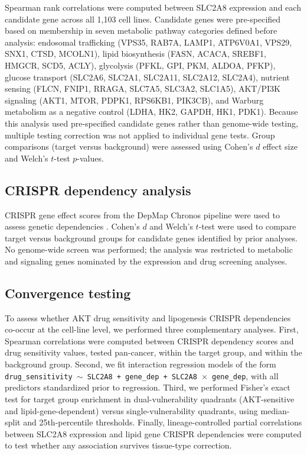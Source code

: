 \documentclass[12pt]{article}
\begin{document}
Spearman rank correlations were computed between SLC2A8 expression and
each candidate gene across all 1,103 cell lines. Candidate genes were
pre-specified based on membership in seven metabolic pathway categories
defined before analysis: endosomal trafficking (VPS35, RAB7A, LAMP1,
ATP6V0A1, VPS29, SNX1, CTSD, MCOLN1), lipid biosynthesis (FASN, ACACA,
SREBF1, HMGCR, SCD5, ACLY), glycolysis (PFKL, GPI, PKM, ALDOA, PFKP),
glucose transport (SLC2A6, SLC2A1, SLC2A11, SLC2A12, SLC2A4), nutrient
sensing (FLCN, FNIP1, RRAGA, SLC7A5, SLC3A2, SLC1A5), AKT/PI3K
signaling (AKT1, MTOR, PDPK1, RPS6KB1, PIK3CB), and Warburg metabolism
as a negative control (LDHA, HK2, GAPDH, HK1, PDK1). Because this analysis used pre-specified candidate genes rather than
genome-wide testing, multiple testing correction was not applied to
individual gene tests. Group comparisons (target versus
background) were assessed using Cohen's $d$ effect size \citep{Cohen1988}
and Welch's $t$-test $p$-values.

\subsection{CRISPR dependency analysis}

CRISPR gene effect scores from the DepMap Chronos pipeline were used
to assess genetic dependencies \citep{Dempster2021}. Cohen's $d$ and
Welch's $t$-test were used to compare target versus background groups
for candidate genes identified by prior analyses. No genome-wide screen
was performed; the analysis was restricted to metabolic and signaling
genes nominated by the expression and drug screening analyses.

\subsection{Convergence testing}

To assess whether AKT drug sensitivity and lipogenesis CRISPR
dependencies co-occur at the cell-line level, we performed three
complementary analyses. First, Spearman correlations were computed
between CRISPR dependency scores and drug sensitivity values, tested
pan-cancer, within the target group, and within the background group.
Second, we fit interaction regression models of the form
\texttt{drug\_sensitivity $\sim$ SLC2A8 + gene\_dep + SLC2A8 $\times$
gene\_dep}, with all predictors standardized prior to regression. Third,
we performed Fisher's exact test for target group enrichment in
dual-vulnerability quadrants (AKT-sensitive and lipid-gene-dependent)
versus single-vulnerability quadrants, using median-split and
25th-percentile thresholds. Finally, lineage-controlled partial
correlations between SLC2A8 expression and lipid gene CRISPR
dependencies were computed to test whether any association survives
tissue-type correction.
\end{document}
